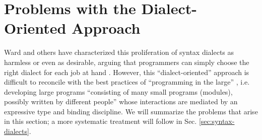 
\section{Problems with the Dialect-Oriented Approach}\label{sec:problems-with-dialects}
Ward and others have characterized this proliferation of syntax dialects as harmless or even as desirable, arguing that programmers can simply choose the right dialect for each job at hand \cite{journals/stp/Ward94}. However, this ``dialect-oriented'' approach is difficult to reconcile with the best practices of ``programming in the large''  \cite{DeRemer76}, i.e. developing large programs ``consisting of many small programs (modules), possibly written by different people'' whose interactions are mediated by an expressive type and binding discipline. We will summarize the problems that arise in this section; a more systematic treatment will follow in  Sec. \ref{sec:syntax-dialects}.

